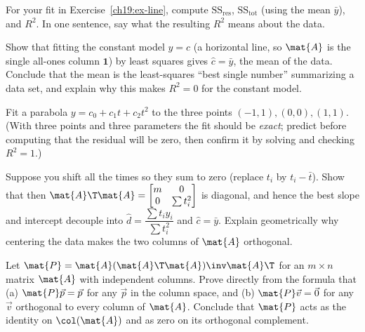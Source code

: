 \begin{exercise}\label{ch19:ex-rsquared}
For your fit in Exercise~\ref{ch19:ex-line}, compute $\mathrm{SS_{res}}$, $\mathrm{SS_{tot}}$
(using the mean $\bar{y}$), and $R^2$. In one sentence, say what the resulting $R^2$ means about
the data.
\end{exercise}

\begin{exercise}\label{ch19:ex-horizontal}
Show that fitting the constant model $y=c$ (a horizontal line, so $\mat{A}$ is the single all-ones
column $\mathbf{1}$) by least squares gives $\hat{c}=\bar{y}$, the mean of the data. Conclude that
the mean is the least-squares ``best single number'' summarizing a data set, and explain why this
makes $R^2=0$ for the constant model.
\end{exercise}

\begin{exercise}\label{ch19:ex-parabola}
Fit a parabola $y=c_0+c_1 t+c_2 t^2$ to the three points $(-1,1),(0,0),(1,1)$. (With three points
and three parameters the fit should be \emph{exact}; predict before computing that the residual
will be zero, then confirm it by solving and checking $R^2=1$.)
\end{exercise}

\begin{exercise}\label{ch19:ex-centering}
Suppose you shift all the times so they sum to zero (replace $t_i$ by $t_i-\bar{t}$). Show that
then $\mat{A}\T\mat{A}=\begin{bmatrix} m & 0\\ 0 & \sum t_i^2\end{bmatrix}$ is diagonal, and hence
the best slope and intercept decouple into $\hat{d}=\dfrac{\sum t_i y_i}{\sum t_i^2}$ and
$\hat{c}=\bar{y}$. Explain geometrically why centering the data makes the two columns of $\mat{A}$
orthogonal.
\end{exercise}

\begin{exercise}\label{ch19:ex-P-properties}
Let $\mat{P}=\mat{A}(\mat{A}\T\mat{A})\inv\mat{A}\T$ for an $m\times n$ matrix $\mat{A}$ with
independent columns. Prove directly from the formula that (a) $\mat{P}\vec{p}=\vec{p}$ for any
$\vec{p}$ in the column space, and (b) $\mat{P}\vec{v}=\vec{0}$ for any $\vec{v}$ orthogonal to
every column of $\mat{A}$. Conclude that $\mat{P}$ acts as the identity on $\col(\mat{A})$ and as
zero on its orthogonal complement.
\end{exercise}

